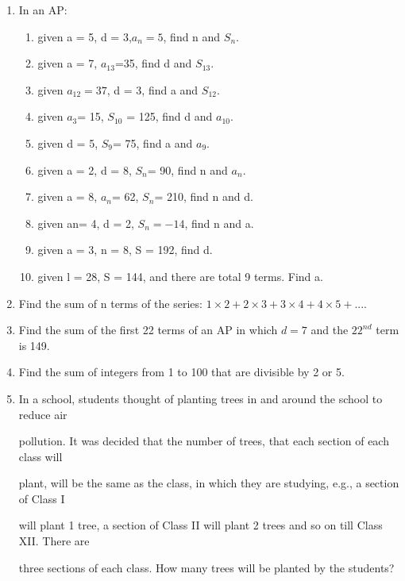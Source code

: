 \begin{enumerate}[label=\thechapter.\arabic*,ref=\thechapter.\theenumi]
\item In an AP:
\begin{enumerate}
\item given a = 5, d = 3,$a_n=5$, find n and $S_n$.
\item given a = 7, $a_{13}$=35, find d and $S_{13}$.
\item given $a_{12}=37$, d = 3, find a and $S_{12}$.
\item given $a_3$= 15, $S_{10}$ = 125, find d and $a_{10}$.
\item given d = 5, $S_9$= 75, find a and $a_9$.
\item given a = 2, d = 8, $S_n$= 90, find n and $a_n$.
\item given a = 8, $a_n$= 62, $S_n$= 210, find n and d.
\item given an= 4, d = 2, $S_n=-14$, find n and a.
\item given a = 3, n = 8, S = 192, find d.
\item given l = 28, S = 144, and there are total 9 terms. Find a.\\
\end{enumerate}
\solution
\pagebreak

\item Find the sum of n terms of the series:
$1\times2+2\times3+3\times4+4\times5+....$\\
\solution
\pagebreak
\item Find the sum of the first 22 terms of an AP in which $d = 7$ and the $22^{nd}$ term is 149.\\
\solution
\pagebreak

\item Find the sum of integers from 1 to 100 that are divisible by 2 or 5.\\
\solution
\pagebreak

\item In a school, students thought of planting trees in and around the school to reduce air

pollution. It was decided that the number of trees, that each section of each class will

plant, will be the same as the class, in which they are studying, e.g., a section of Class I

will plant 1 tree, a section of Class II will plant 2 trees and so on till Class XII. There are

three sections of each class. How many trees will be planted by the students?\\
\solution
\pagebreak
\end{enumerate}
